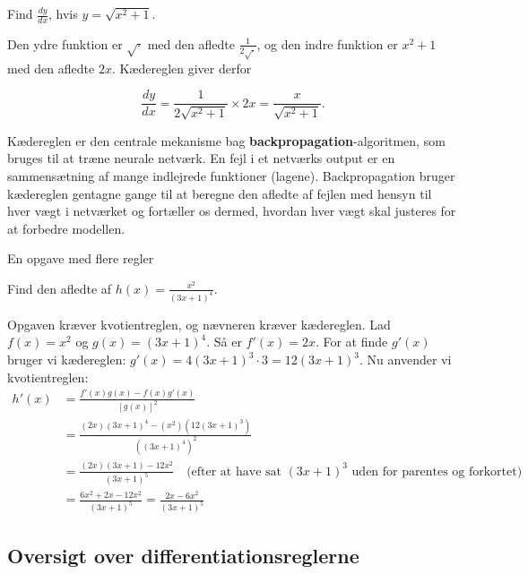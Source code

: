 \begin{example}

    Find \(\frac{d y}{d x}\), hvis \(y=\sqrt{x^2+1}\).

\end{example}
\begin{solution}
    Den ydre funktion er \(\sqrt{\cdot}\) med den afledte \(\frac{1}{2\sqrt{\cdot}}\), og den indre funktion er \(x^2+1\) med den afledte \(2x\). Kædereglen giver derfor

    \[
    \frac{d y}{d x} = \frac{1}{2\sqrt{x^2+1}} \times 2x = \frac{x}{\sqrt{x^2+1}}.
    \]
\end{solution}

Kædereglen er den centrale mekanisme bag \textbf{backpropagation}-algoritmen, som bruges til at træne neurale netværk. En fejl i et netværks output er en sammensætning af mange indlejrede funktioner (lagene). Backpropagation bruger kædereglen gentagne gange til at beregne den afledte af fejlen med hensyn til hver vægt i netværket og fortæller os dermed, hvordan hver vægt skal justeres for at forbedre modellen.

\begin{example} En opgave med flere regler

Find den afledte af \( h(x) = \frac{x^2}{(3x+1)^4} \).
\end{example}

\begin{solution}
Opgaven kræver kvotientreglen, og nævneren kræver kædereglen.
Lad \( f(x) = x^2 \) og \( g(x) = (3x+1)^4 \).
Så er \( f'(x) = 2x \). For at finde \( g'(x) \) bruger vi kædereglen: \( g'(x) = 4(3x+1)^3 \cdot 3 = 12(3x+1)^3 \).
Nu anvender vi kvotientreglen:
\[
\begin{aligned}
h'(x) &= \frac{f'(x)g(x) - f(x)g'(x)}{[g(x)]^2} \\
&= \frac{(2x)(3x+1)^4 - (x^2)(12(3x+1)^3)}{((3x+1)^4)^2} \\
&= \frac{(2x)(3x+1) - 12x^2}{(3x+1)^5} \quad \text{(efter at have sat \((3x+1)^3\) uden for parentes og forkortet)} \\
&= \frac{6x^2 + 2x - 12x^2}{(3x+1)^5} = \frac{2x - 6x^2}{(3x+1)^5}
\end{aligned}
\]
\end{solution}

\subsection*{Oversigt over differentiationsreglerne}
\label{sec:ch10-common}

